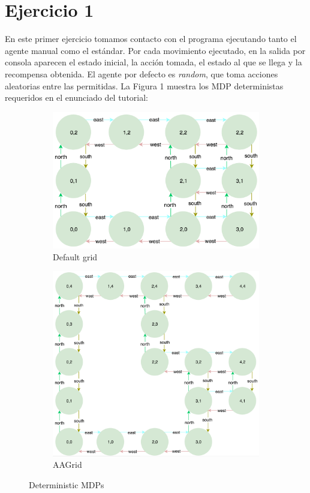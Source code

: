 \documentclass[12pt]{article}
\begin{document}
\newpage
\section{Ejercicio 1}

En este primer ejercicio tomamos contacto con el programa ejecutando tanto el agente manual como el estándar.
Por cada movimiento ejecutado, en la salida por consola aparecen el estado inicial, la acción tomada, el estado al que se llega y la recompensa obtenida. El agente por defecto es \textit{random}, que toma acciones aleatorias entre las permitidas. La Figura 1 muestra los MDP deterministas requeridos en el enunciado del tutorial:

\begin{figure}[h]
    \centering
    \begin{subfigure}{.5\textwidth}
        \centering
        \includegraphics[width=.85\linewidth]{MDP_deterministic}
        \caption{Default grid}
        \label{fig:sub1}
    \end{subfigure}%
    \begin{subfigure}{.5\textwidth}
        \centering
        \includegraphics[width=.85\linewidth]{MDP_deterministic2}
        \caption{AAGrid}
        \label{fig:sub2}
    \end{subfigure}
    \caption{Deterministic MDPs}
    \label{fig:test}
\end{figure}
\end{document}
